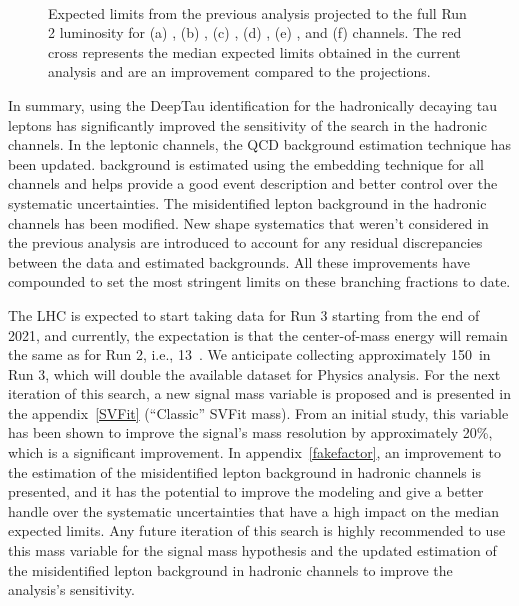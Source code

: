 \begin{figure}[htbp!]
  \hspace{0.5cm}
  \\
  \caption{Expected limits from the previous analysis projected to the full Run 2 luminosity for (a) \muhad, (b) \ehad, (c) \mue, (d) \emu, (e) \mutau, and (f) \etau channels. The red cross represents the median expected limits obtained in the current analysis and are an improvement compared to the projections.}
  \label{fig:projections}
\end{figure}

In summary, using the DeepTau identification for the hadronically decaying tau leptons has significantly improved the sensitivity of the search in the hadronic channels. In the leptonic channels, the QCD background estimation technique has been updated. \Ztt background is estimated using the embedding technique for all channels and helps provide a good event description and better control over the systematic uncertainties. The misidentified lepton background in the hadronic channels has been modified. New shape systematics that weren't considered in the previous analysis are introduced to account for any residual discrepancies between the data and estimated backgrounds. All these improvements have compounded to set the most stringent limits on these branching fractions to date.

The LHC is expected to start taking data for Run 3 starting from the end of 2021, and currently, the expectation is that the center-of-mass energy will remain the same as for Run 2, i.e., 13~\TeV. We anticipate collecting approximately 150~\fb in Run 3, which will double the available dataset for Physics analysis. For the next iteration of this search, a new signal mass variable is proposed and is presented in the appendix~\ref{SVFit} (``Classic'' SVFit mass). From an initial study, this variable has been shown to improve the signal's mass resolution by approximately 20\%, which is a significant improvement. In appendix~\ref{fakefactor}, an improvement to the estimation of the misidentified lepton background in hadronic channels is presented, and it has the potential to improve the modeling and give a better handle over the systematic uncertainties that have a high impact on the median expected limits. Any future iteration of this search is highly recommended to use this mass variable for the signal mass hypothesis and the updated estimation of the misidentified lepton background in hadronic channels to improve the analysis's sensitivity.

